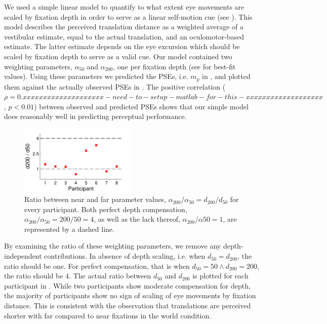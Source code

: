 We used a simple linear model to quantify to what extent eye movements are scaled by fixation depth in order to serve as a linear self-motion cue (see ). This model describes the perceived translation distance as a weighted average of a vestibular estimate, equal to the actual translation, and an oculomotor-based estimate. The latter estimate depends on the eye excursion which should be scaled by fixation depth to serve as a valid cue. Our model contained two weighting parameters, $\alpha_{50}$ and $\alpha_{200}$, one per fixation depth (see  for best-fit values). Using these parameters we predicted the PSEs, i.e. $m_p$ in , and plotted them against the actually observed PSEs in . The positive correlation ($\rho = 0.xxxxxxxxxxxxxxxxxxxx-need-to-setup-matlab-for-this-xxxxxxxxxxxxxxxxxxx$, $p < 0.01$) between observed and predicted PSEs shows that our simple model does reasonably well in predicting perceptual performance.

\begin{figure}
    \includegraphics[width=0.5\textwidth]{src/paper4/p4_figure5.pdf}

	\caption{Ratio between near and far parameter values, $\alpha_{200} / \alpha_{50} = d_{200} / d_{50}$ for every participant. Both perfect depth compensation, $\alpha_{200} / \alpha_{50} = 200 / 50 = 4$, as well as the lack thereof, $\alpha_{200} / \alpha{50} = 1$, are represented by a dashed line.}
	\label{p4:fig5}
\end{figure}

By examining the ratio of these weighting parameters, we remove any depth-independent contributions. In absence of  depth scaling, i.e. when $d_{50} = d_{200}$, the ratio should be one. For perfect compensation, that is when $d_{50} = 50  \wedge d_{200} = 200$, the ratio should be $4$. The actual ratio between $d_{50}$ and $d_{200}$ is plotted for each participant in . While two participants show moderate compensation for depth, the majority of participants show no sign of scaling of eye movements by fixation distance. This is consistent with the observation that translations are perceived shorter with far compared to near fixations in the world condition.
